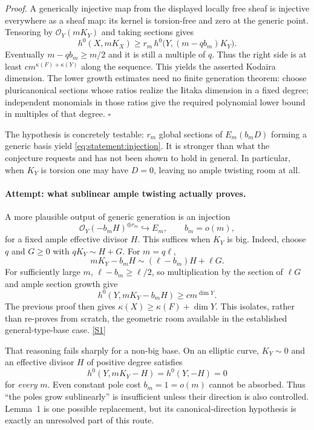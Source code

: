 \documentclass[11pt,a4paper]{article}
\newcommand{\sref}[2]{\hyperlink{source:#1:#2}{[S#2]}}
\numberwithin{equation}{section}
\begin{document}
\emph{Proof.} A generically injective map from the displayed locally free
sheaf is injective everywhere as a sheaf map: its kernel is torsion-free
and zero at the generic point. Tensoring by $\mathcal O_Y(mK_Y)$ and taking
sections gives
\[
 h^0(X,mK_X)\geq r_m\,
 h^0\bigl(Y,(m-qb_m)K_Y\bigr).
\]
Eventually $m-qb_m\geq m/2$ and it is still a multiple of $q$. Thus the
right side is at least $c m^{\kappa(F)+\kappa(Y)}$ along the sequence.
This yields the asserted Kodaira dimension. The lower growth estimates
need no finite generation theorem: choose pluricanonical sections whose
ratios realize the Iitaka dimension in a fixed degree; independent
monomials in those ratios give the required polynomial lower bound in
multiples of that degree. $\square$

The hypothesis is concretely testable: $r_m$ global sections of
$E_m(b_mD)$ forming a generic basis yield \eqref{eq:statement:injection}.
It is stronger than what the conjecture requests and has not been shown
to hold in general. In particular, when $K_Y$ is torsion one may have
$D=0$, leaving no ample twisting room at all.

\paragraph{Attempt: what sublinear ample twisting actually proves.}
A more plausible output of generic generation is an injection
\[
 \mathcal O_Y(-b_mH)^{\oplus r_m}\hookrightarrow E_m,
 \qquad b_m=o(m),
\]
for a fixed ample effective divisor $H$. This suffices when $K_Y$ is big.
Indeed, choose $q$ and $G\geq0$ with $qK_Y\sim H+G$. For $m=q\ell$,
\[
 mK_Y-b_mH\sim(\ell-b_m)H+\ell G.
\]
For sufficiently large $m$, $\ell-b_m\geq\ell/2$, so multiplication by
the section of $\ell G$ and ample section growth give
\[
 h^0(Y,mK_Y-b_mH)\geq c m^{\dim Y}.
\]
The previous proof then gives $\kappa(X)\geq\kappa(F)+\dim Y$.
This isolates, rather than re-proves from scratch, the geometric room
available in the established general-type-base case. \sref{statement}{1}

That reasoning fails sharply for a non-big base. On an elliptic curve,
$K_Y\sim0$ and an effective divisor $H$ of positive degree satisfies
\[
 h^0(Y,mK_Y-H)=h^0(Y,-H)=0
\]
for \emph{every} $m$. Even constant pole cost $b_m=1=o(m)$ cannot be
absorbed. Thus ``the poles grow sublinearly'' is insufficient unless
their direction is also controlled. Lemma~1 is one possible replacement,
but its canonical-direction hypothesis is exactly an unresolved part
of this route.
\end{document}
